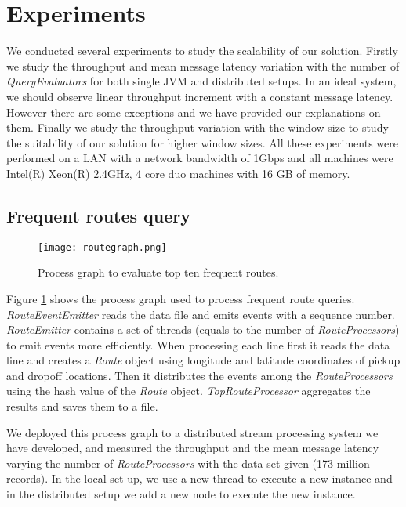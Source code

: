\section{Experiments}
We conducted several experiments to study the scalability of our solution. Firstly we study the throughput and mean message latency variation with the number of \textit{QueryEvaluators} for both single JVM and distributed setups. In an ideal system, we should observe linear throughput increment with a constant message latency. However there are some exceptions and we have provided our explanations on them. Finally we study the throughput variation with the window size to study the suitability of our solution for higher window sizes. All these experiments were performed on a LAN with a network bandwidth of 1Gbps and all machines were Intel(R) Xeon(R) 2.4GHz, 4 core duo machines with 16 GB of memory. 

\subsection{Frequent routes query}

\begin{figure}[!t]
        \centering
        \texttt{[image: routegraph.png]}
        \caption{Process graph to evaluate top ten frequent routes.}
        \label{routegraph}
\end{figure}

Figure \ref{routegraph} shows the process graph used to process frequent route queries. \textit{RouteEventEmitter} reads the data file and emits events with a sequence number. \textit{RouteEmitter} contains a set of threads (equals to the number of \textit{RouteProcessors}) to emit events more efficiently. When processing each line first it reads the data line and creates a \textit{Route} object using longitude and latitude coordinates of pickup and dropoff locations. Then it distributes the events among the \textit{RouteProcessors} using the hash value of the \textit{Route} object. \textit{TopRouteProcessor} aggregates the results and saves them to a file.

We deployed this process graph to a distributed stream processing system we have developed, and  measured the throughput and the mean message latency varying the number of \textit{RouteProcessors} with the data set given (173 million records). In the local set up, we use a new thread to execute a new instance and in the distributed setup we add a new node to execute the new instance.


